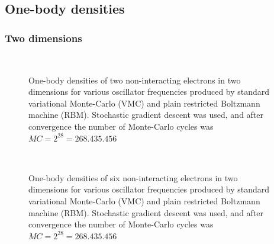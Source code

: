 \subsection{One-body densities}
\subsubsection{Two dimensions}
\begin{figure} [H]%
	\centering
	\\
	
	\caption{One-body densities of two non-interacting electrons in two dimensions for various oscillator frequencies produced by standard variational Monte-Carlo (VMC) and plain restricted Boltzmann machine (RBM). Stochastic gradient descent was used, and after convergence the number of Monte-Carlo cycles was $MC=2^{28}=268.435.456$}%
	\label{fig:OB_interaction_2P_2D}
\end{figure}

\begin{figure} [H]%
	\centering
	\\
	
	\caption{One-body densities of six non-interacting electrons in two dimensions for various oscillator frequencies produced by standard variational Monte-Carlo (VMC) and plain restricted Boltzmann machine (RBM). Stochastic gradient descent was used, and after convergence the number of Monte-Carlo cycles was $MC=2^{28}=268.435.456$}%
	\label{fig:OB_interaction_6P_2D}
\end{figure}

